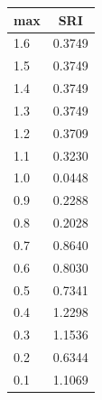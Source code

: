 \documentclass[thesis=M,czech]{FITthesis}[2012/06/26]
\begin{document}
\vspace{\baselineskip}
\noindent
\begin{minipage}{\textwidth}
  \begin{minipage}[b]{0.19\textwidth}
  \centering
        \begin{tabular}{|l|c|}
        \hline
        \multicolumn{1}{|c|}{max}                     & SRI  \\ \hline
        {\color[HTML]{000000}  1.6 } & {\color[HTML]{000000} 0.3749} \\ \hline
              1.5                        &  0.3749                      \\ \hline
          1.4                        &  0.3749                      \\ \hline
          1.3                        &  0.3749                      \\ \hline
        1.2                        &  0.3709                      \\ \hline
        1.1                        & 0.3230                      \\ \hline
        1.0                        & 0.0448                      \\ \hline
        0.9                        & 0.2288                      \\ \hline
        0.8                        & 0.2028                      \\ \hline
        0.7                        & 0.8640                      \\ \hline
        0.6                        & 0.8030                      \\ \hline
        0.5                        & 0.7341                      \\ \hline
        0.4                        & 1.2298                      \\ \hline
        0.3                        & 1.1536                      \\ \hline
        0.2                        & 0.6344                      \\ \hline
        0.1                        & 1.1069                      \\ \hline
        

\end{tabular}
\end{minipage}
\end{minipage}
\end{document}
